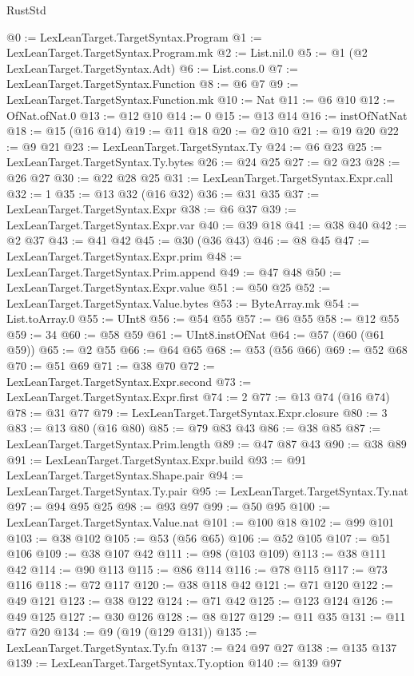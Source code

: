 \begin{lexlean}{RustStd}
\begin{coremodule}
@0 := LexLeanTarget.TargetSyntax.Program
@1 := LexLeanTarget.TargetSyntax.Program.mk
@2 := List.nil.{0}
@5 := @1 (@2 LexLeanTarget.TargetSyntax.Adt)
@6 := List.cons.{0}
@7 := LexLeanTarget.TargetSyntax.Function
@8 := @6 @7
@9 := LexLeanTarget.TargetSyntax.Function.mk
@10 := Nat
@11 := @6 @10
@12 := OfNat.ofNat.{0}
@13 := @12 @10
@14 := 0
@15 := @13 @14
@16 := instOfNatNat
@18 := @15 (@16 @14)
@19 := @11 @18
@20 := @2 @10
@21 := @19 @20
@22 := @9 @21
@23 := LexLeanTarget.TargetSyntax.Ty
@24 := @6 @23
@25 := LexLeanTarget.TargetSyntax.Ty.bytes
@26 := @24 @25
@27 := @2 @23
@28 := @26 @27
@30 := @22 @28 @25
@31 := LexLeanTarget.TargetSyntax.Expr.call
@32 := 1
@35 := @13 @32 (@16 @32)
@36 := @31 @35
@37 := LexLeanTarget.TargetSyntax.Expr
@38 := @6 @37
@39 := LexLeanTarget.TargetSyntax.Expr.var
@40 := @39 @18
@41 := @38 @40
@42 := @2 @37
@43 := @41 @42
@45 := @30 (@36 @43)
@46 := @8 @45
@47 := LexLeanTarget.TargetSyntax.Expr.prim
@48 := LexLeanTarget.TargetSyntax.Prim.append
@49 := @47 @48
@50 := LexLeanTarget.TargetSyntax.Expr.value
@51 := @50 @25
@52 := LexLeanTarget.TargetSyntax.Value.bytes
@53 := ByteArray.mk
@54 := List.toArray.{0}
@55 := UInt8
@56 := @54 @55
@57 := @6 @55
@58 := @12 @55
@59 := 34
@60 := @58 @59
@61 := UInt8.instOfNat
@64 := @57 (@60 (@61 @59))
@65 := @2 @55
@66 := @64 @65
@68 := @53 (@56 @66)
@69 := @52 @68
@70 := @51 @69
@71 := @38 @70
@72 := LexLeanTarget.TargetSyntax.Expr.second
@73 := LexLeanTarget.TargetSyntax.Expr.first
@74 := 2
@77 := @13 @74 (@16 @74)
@78 := @31 @77
@79 := LexLeanTarget.TargetSyntax.Expr.closure
@80 := 3
@83 := @13 @80 (@16 @80)
@85 := @79 @83 @43
@86 := @38 @85
@87 := LexLeanTarget.TargetSyntax.Prim.length
@89 := @47 @87 @43
@90 := @38 @89
@91 := LexLeanTarget.TargetSyntax.Expr.build
@93 := @91 LexLeanTarget.TargetSyntax.Shape.pair
@94 := LexLeanTarget.TargetSyntax.Ty.pair
@95 := LexLeanTarget.TargetSyntax.Ty.nat
@97 := @94 @95 @25
@98 := @93 @97
@99 := @50 @95
@100 := LexLeanTarget.TargetSyntax.Value.nat
@101 := @100 @18
@102 := @99 @101
@103 := @38 @102
@105 := @53 (@56 @65)
@106 := @52 @105
@107 := @51 @106
@109 := @38 @107 @42
@111 := @98 (@103 @109)
@113 := @38 @111 @42
@114 := @90 @113
@115 := @86 @114
@116 := @78 @115
@117 := @73 @116
@118 := @72 @117
@120 := @38 @118 @42
@121 := @71 @120
@122 := @49 @121
@123 := @38 @122
@124 := @71 @42
@125 := @123 @124
@126 := @49 @125
@127 := @30 @126
@128 := @8 @127
@129 := @11 @35
@131 := @11 @77 @20
@134 := @9 (@19 (@129 @131))
@135 := LexLeanTarget.TargetSyntax.Ty.fn
@137 := @24 @97 @27
@138 := @135 @137
@139 := LexLeanTarget.TargetSyntax.Ty.option
@140 := @139 @97

\end{coremodule}
\end{lexlean}
